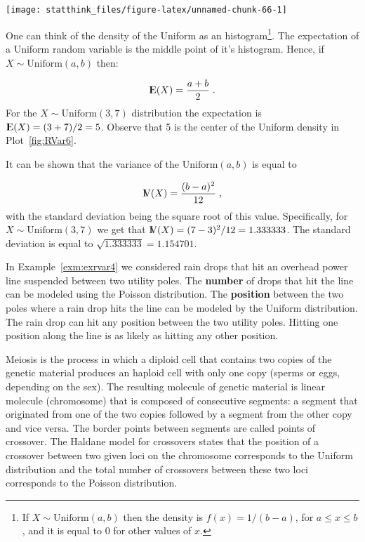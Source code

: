\documentclass[]{krantz}
\newcommand{\Expec}{{\rm I\kern-.3em E}}
\newcommand{\Var}{{\rm I\kern-.3em V}}
\theoremstyle{definition}
\theoremstyle{definition}
\theoremstyle{definition}
\theoremstyle{remark}
\let\BeginKnitrBlock\begin \let\EndKnitrBlock\end
\begin{document}
\begin{center}\texttt{[image: statthink\_files/figure-latex/unnamed-chunk-66-1]} \end{center}

One can think of the density of the Uniform as an histogram\footnote{If
  \(X \sim \mathrm{Uniform}(a,b)\) then the density is
  \(f(x) = 1/(b-a)\), for \(a \leq x \leq b\), and it is equal to 0 for
  other values of \(x\).}. The expectation of a Uniform random variable
is the middle point of it's histogram. Hence, if
\(X \sim \mathrm{Uniform}(a,b)\) then:

\[\Expec(X) = \frac{a+b}{2}\;.\] For the
\(X \sim \mathrm{Uniform}(3,7)\) distribution the expectation is
\(\Expec(X)= (3+7)/2 = 5\). Observe that 5 is the center of the Uniform
density in Plot~\ref{fig:RVar6}.

It can be shown that the variance of the \(\mathrm{Uniform}(a,b)\) is
equal to

\[\Var(X) = \frac{(b-a)^2}{12}\;,\] with the standard deviation being
the square root of this value. Specifically, for
\(X \sim \mathrm{Uniform}(3,7)\) we get that
\(\Var(X) = (7-3)^2/12 = 1.333333\). The standard deviation is equal to
\(\sqrt{1.333333} = 1.154701\).

\BeginKnitrBlock{example}
\protect\hypertarget{exm:exrvar5}{}{\label{exm:exrvar5} }In
Example~\ref{exm:exrvar4} we considered rain drops that hit an overhead
power line suspended between two utility poles. The {\textbf{number}} of
drops that hit the line can be modeled using the Poisson distribution.
The {\textbf{position}} between the two poles where a rain drop hits the
line can be modeled by the Uniform distribution. The rain drop can hit
any position between the two utility poles. Hitting one position along
the line is as likely as hitting any other position.
\EndKnitrBlock{example}

\BeginKnitrBlock{example}
\protect\hypertarget{exm:exrvar6}{}{\label{exm:exrvar6} }Meiosis is the
process in which a diploid cell that contains two copies of the genetic
material produces an haploid cell with only one copy (sperms or eggs,
depending on the sex). The resulting molecule of genetic material is
linear molecule (chromosome) that is composed of consecutive segments: a
segment that originated from one of the two copies followed by a segment
from the other copy and vice versa. The border points between segments
are called points of crossover. The Haldane model for crossovers states
that the position of a crossover between two given loci on the
chromosome corresponds to the Uniform distribution and the total number
of crossovers between these two loci corresponds to the Poisson
distribution.
\EndKnitrBlock{example}
\end{document}
